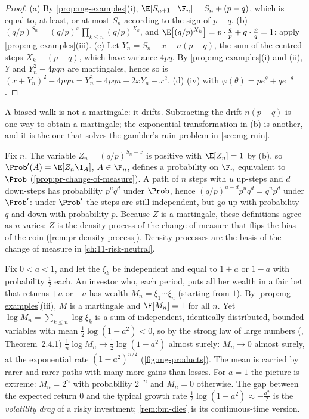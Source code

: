 \begin{proof}
(a) By \cref{prop:mg-examples}(i), $\E[S_{n+1}\mid\F_n]=S_n+(p-q)$, which is equal to,
at least, or at most $S_n$ according to the sign of $p-q$.
(b) $(q/p)^{S_n}=(q/p)^x\prod_{k\le n}(q/p)^{X_k}$, and
$\E\big[(q/p)^{X_k}\big]=p\cdot\frac qp+q\cdot\frac pq=1$: apply \cref{prop:mg-examples}(iii).
(c) Let $Y_n=S_n-x-n(p-q)$, the sum of the centred steps $X_k-(p-q)$, which have variance
$4pq$. By \cref{prop:mg-examples}(i) and (ii), $Y$ and $Y_n^2-4pqn$ are martingales, hence
so is $(x+Y_n)^2-4pqn=Y_n^2-4pqn+2xY_n+x^2$.
(d) (iv) with $\varphi(\theta)=pe^\theta+qe^{-\theta}$.
\end{proof}

A biased walk is not a martingale: it drifts. Subtracting the drift $n(p-q)$ is one way to
obtain a martingale; the exponential transformation in (b) is another, and it is the one that
solves the gambler's ruin problem in \cref{sec:mg-ruin}.

\begin{remark}\label{rem:mg-density}
Fix $n$. The variable $Z_n=(q/p)^{S_n-x}$ is positive with $\E[Z_n]=1$ by (b), so
$\Prob'(A)=\E[Z_n\1_A]$, $A\in\F_n$, defines a probability on $\F_n$ equivalent to $\Prob$
(\cref{prop:pr-change-of-measure}). A path of $n$ steps with $u$ up-steps and $d$ down-steps
has probability $p^uq^d$ under $\Prob$, hence $(q/p)^{u-d}p^uq^d=q^up^d$ under $\Prob'$: under
$\Prob'$ the steps are still independent, but go up with probability $q$ and down with
probability $p$. Because $Z$ is a martingale, these definitions agree as $n$ varies: $Z$ is the
density process of the change of measure that flips the bias of the coin
(\cref{rem:pr-density-process}). Density processes are the basis of the change of measure in
\cref{ch:11-risk-neutral}.
\end{remark}

\begin{remark}\label{rem:mg-dies}
Fix $0<a<1$, and let the $\xi_k$ be independent and equal to $1+a$ or $1-a$ with probability
$\frac12$ each. An investor who, each period, puts all her wealth in a fair bet that returns
$+a$ or $-a$ has wealth $M_n=\xi_1\cdots\xi_n$ (starting from $1$). By
\cref{prop:mg-examples}(iii), $M$ is a martingale and $\E[M_n]=1$ for all $n$. Yet
$\log M_n=\sum_{k\le n}\log\xi_k$ is a sum of independent, identically distributed, bounded
variables with mean $\frac12\log(1-a^2)<0$, so by the strong law of large numbers
(\textcite{durrett}, Theorem~2.4.1) $\frac1n\log M_n\to\frac12\log(1-a^2)$ almost surely:
$M_n\to0$ almost surely, at the exponential rate $(1-a^2)^{n/2}$
(\cref{fig:mg-products}). The mean is carried by rarer and rarer paths with many more
gains than losses. For $a=1$ the picture is extreme: $M_n=2^n$ with probability $2^{-n}$ and
$M_n=0$ otherwise. The gap between the expected return $0$ and the typical growth rate
$\frac12\log(1-a^2)\approx-\frac{a^2}{2}$ is the \emph{volatility drag} of a risky
investment; \cref{rem:bm-dies} is its continuous-time version.
\end{remark}

